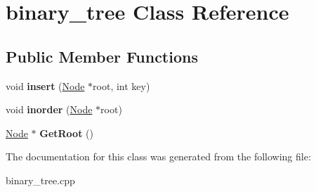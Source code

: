 \hypertarget{classbinary__tree}{}\section{binary\+\_\+tree Class Reference}
\label{classbinary__tree}
\subsection*{Public Member Functions}
\begin{DoxyCompactItemize}
\item 
void {\bfseries insert} (\hyperlink{structNode}{Node} $\ast$root, int key)\hypertarget{classbinary__tree_a44bb7fc022116de5cd6295de6eb294d6}{}\label{classbinary__tree_a44bb7fc022116de5cd6295de6eb294d6}

\item 
void {\bfseries inorder} (\hyperlink{structNode}{Node} $\ast$root)\hypertarget{classbinary__tree_a553a66c4b3d9676538dd48d31df7963e}{}\label{classbinary__tree_a553a66c4b3d9676538dd48d31df7963e}

\item 
\hyperlink{structNode}{Node} $\ast$ {\bfseries Get\+Root} ()\hypertarget{classbinary__tree_ac3deb696c9351826b44cef02f961238a}{}\label{classbinary__tree_ac3deb696c9351826b44cef02f961238a}

\end{DoxyCompactItemize}


The documentation for this class was generated from the following file\+:\begin{DoxyCompactItemize}
\item 
binary\+\_\+tree.\+cpp\end{DoxyCompactItemize}
